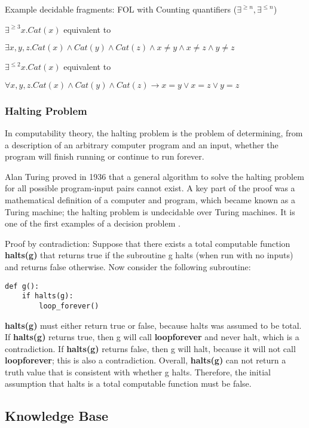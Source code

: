 Example decidable fragments: FOL with Counting quantifiers ($\exists^{\geq n}, \exists^{\leq n}$)

$\exists^{\geq 3}x.Cat(x)$ equivalent to

$\exists x,y,z.Cat(x) \land Cat(y) \land Cat(z) \land x \neq y \land x \neq z \land y \neq z $

$\exists^{\leq 2}x.Cat(x)$ equivalent to

$\forall x,y,z.Cat(x) \land Cat(y) \land Cat(z) \rightarrow x=y \lor x=z \lor y=z $

\subsubsection{Halting Problem}
\label{sec:halting_problem}
In computability theory, the halting problem is the problem of determining, from a description of an arbitrary computer program and an input, whether the program will finish running or continue to run forever.

Alan Turing proved in 1936 that a general algorithm to solve the halting problem for all possible program-input pairs cannot exist. A key part of the proof was a mathematical definition of a computer and program, which became known as a Turing machine; the halting problem is undecidable over Turing machines. It is one of the first examples of a decision problem \cite{halting_problem}.

Proof by contradiction:
Suppose that there exists a total computable function \textbf{halts(g)} that returns true if the subroutine g halts (when run with no inputs) and returns false otherwise. Now consider the following subroutine:
\begin{lstlisting}
def g():
    if halts(g):
        loop_forever()
\end{lstlisting}
\textbf{halts(g)} must either return true or false, because halts was assumed to be total. 
If \textbf{halts(g)} returns true, then g will call \textbf{loop\textunderscore forever} 
and never halt, which is a contradiction. 
If \textbf{halts(g)} returns false, then g will halt, 
because it will not call \textbf{loop\textunderscore forever}; this is also a contradiction. 
Overall, \textbf{halts(g)} can not return a truth value that is consistent with whether g halts. 
Therefore, the initial assumption that halts is a total computable function must be false.

\subsection{Knowledge Base}
\label{sec:KB}

